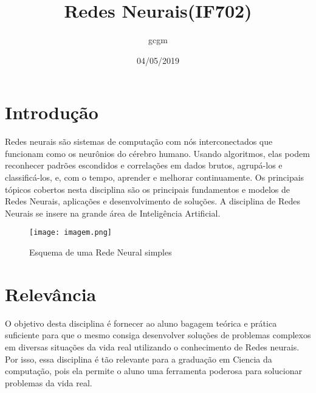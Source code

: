 \documentclass{article}
\title{Redes Neurais(IF702)}
\author{gcgm}
\date{04/05/2019}
\begin{document}
\maketitle

\section{Introdução}
Redes neurais são sistemas de computação com nós interconectados que funcionam como os neurônios do cérebro humano. Usando algoritmos, elas podem reconhecer padrões escondidos e correlações em dados brutos, agrupá-los e classificá-los, e, com o tempo, aprender e melhorar continuamente.\citep{site2}
\newline
Os principais tópicos cobertos nesta disciplina são os principais fundamentos e modelos de Redes Neurais, aplicações e desenvolvimento de soluções.\citep{disciplina}
\newline
A disciplina de Redes Neurais se insere na grande área de Inteligência Artificial.
\begin{figure}[h!]
\centering
\texttt{[image: imagem.png]}\citep{wiki:1}
\caption{Esquema de uma Rede Neural simples}
\label{fig:download}
\end{figure}


\section{Relevância}    

O objetivo desta disciplina é fornecer ao aluno bagagem teórica e prática suficiente para que o mesmo consiga desenvolver soluções de problemas complexos em diversas situações da vida real utilizando o conhecimento de Redes neurais.\newline
Por isso, essa disciplina é tão relevante para a graduação em Ciencia da computação, pois ela permite o aluno uma ferramenta poderosa para solucionar problemas da vida real.
\end{document}

